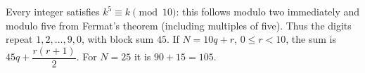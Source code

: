 Every integer satisfies $k^5\equiv k\pmod{10}$: this follows modulo two immediately and modulo five from Fermat's theorem (including multiples of five). Thus the digits repeat $1,2,\ldots,9,0$, with block sum $45$. If $N=10q+r$, $0\le r<10$, the sum is $\boxed{45q+\dfrac{r(r+1)}{2}}$. For $N=25$ it is $90+15=\boxed{105}$.
